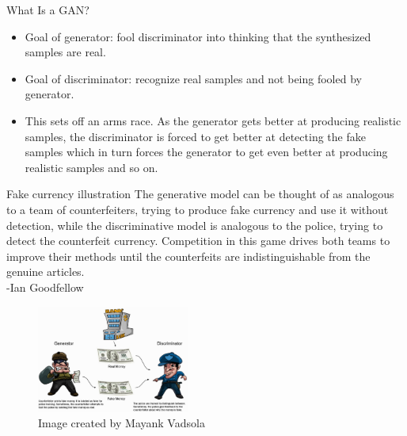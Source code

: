     \begin{frame} {What Is a GAN?}
\begin{figure}
\centering
{}
\end{figure}
\begin{itemize}
\item Goal of generator: fool discriminator into thinking that the synthesized samples are real.
\item Goal of discriminator: recognize real samples and not being fooled by  generator.
\item This sets off an arms race. As the generator gets better at producing realistic samples, the discriminator is forced to get better at detecting the fake samples which in turn forces the generator to get even better at producing realistic samples and so on.
\end{itemize}
\end{frame}

\begin{frame} {Fake currency illustration}
\vspace{1mm}
The generative model can be thought of as analogous to a team of counterfeiters, trying to produce fake currency and use it without detection, while the discriminative model is analogous to the police, trying to detect the counterfeit currency. Competition in this game drives both teams to improve their methods until the counterfeits are indistinguishable from the genuine articles. \\
\hspace{45mm} -Ian Goodfellow

\begin{figure}
\includegraphics[width=5cm]{plots/counterfeiters.png}
\tiny{\\Image created by Mayank Vadsola}
\end{figure}

\end{frame}



